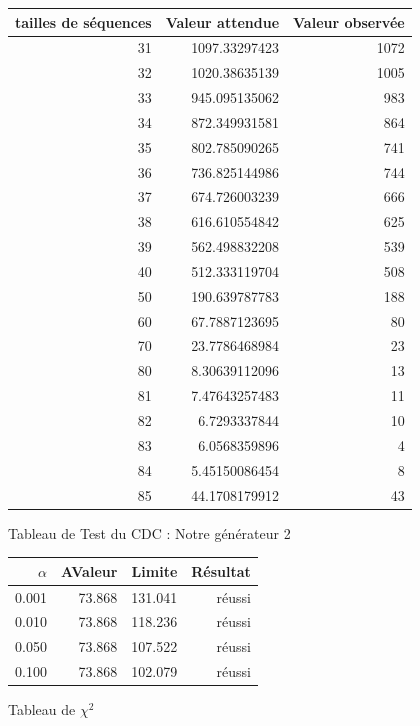 \documentclass[10pt,a4paper]{article}
\begin{document}
\begin{figure}[h]
\centering
\begin{tabular}{|r|r|r|}
\hline
tailles de séquences  & Valeur attendue & Valeur observée\\
\hline
31 & 1097.33297423 & 1072\\
32 & 1020.38635139 & 1005\\
33 & 945.095135062 & 983\\
34 & 872.349931581 & 864\\
35 & 802.785090265 & 741\\
36 & 736.825144986 & 744\\
37 & 674.726003239 & 666\\
38 & 616.610554842 & 625\\
39 & 562.498832208 & 539\\
40 & 512.333119704 & 508\\
50 & 190.639787783 & 188\\
60 & 67.7887123695 & 80\\
70 & 23.7786468984 & 23\\
80 & 8.30639112096 & 13\\
81 & 7.47643257483 & 11\\
82 & 6.7293337844 & 10\\
83 & 6.0568359896 & 4\\
84 & 5.45150086454 & 8\\
85 & 44.1708179912 & 43\\
\hline
\end{tabular}
\caption{Tableau de Test du CDC : Notre générateur 2}
\end{figure}




\begin{figure}[h]
\centering
\begin{tabular}{|r|r|r|r|}
\hline
$\alpha$ & AValeur & Limite & Résultat\\
\hline
0.001 & 73.868 & 131.041 & réussi\\
0.010 & 73.868 & 118.236 & réussi\\
0.050 & 73.868 & 107.522 & réussi\\
0.100 & 73.868 & 102.079 & réussi\\
\hline
\end{tabular}
\caption{Tableau de $\chi^2$}
\end{figure}
\end{document}
